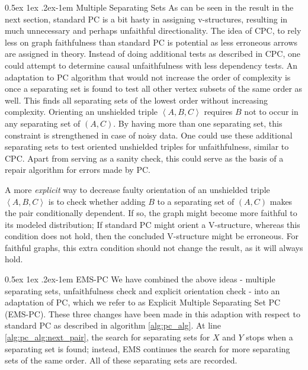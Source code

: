 \documentclass[a4paper, 10pt, english, onecolumn]{article}
\makeatletter
\renewcommand{\paragraph}{%
  \@startsection{paragraph}{4}%
  {\z@}{0.5ex \@plus 1ex \@minus .2ex}{-1em}%
  {\normalfont\normalsize\bfseries}%
}
\makeatother
\begin{document}
\paragraph{Multiple Separating Sets}
As can be seen in the result in the next section, standard PC is a bit hasty in assigning v-structures, resulting in much unnecessary and perhaps unfaithful directionality.
The idea of CPC, to rely less on graph faithfulness than standard PC is potential as less erroneous arrows are assigned in theory.
Instead of doing additional tests as described in CPC, one could attempt to determine causal unfaithfulness with less dependency tests.
An adaptation to PC algorithm that would not increase the order of complexity is once a separating set is found to test all other vertex subsets of the same order as well.
This finds all separating sets of the lowest order without increasing complexity.
Orienting an unshielded triple $\left<A,B,C\right>$ requires $B$ not to occur in any separating set of $(A,C)$.
By having more than one separating set, this constraint is strengthened in case of noisy data.
One could use these additional separating sets to test oriented unshielded triples for unfaithfulness, similar to CPC.
Apart from serving as a sanity check, this could serve as the basis of a repair algorithm for errors made by PC.

A more \textit{explicit} way to decrease faulty orientation of an unshielded triple $\left<A,B,C\right>$ is to check whether adding $B$ to a separating set of $(A,C)$ makes the pair conditionally dependent.
If so, the graph might become more faithful to its modeled distribution; If standard PC might orient a V-structure, whereas this condition does not hold, then the concluded V-structure might be erroneous.
For faithful graphs, this extra condition should not change the result, as it will always hold.

\paragraph{EMS-PC}
We have combined the above ideas - multiple separating sets, unfaithfulness check and explicit orientation check - into an adaptation of PC, which we refer to as Explicit Multiple Separating Set PC (EMS-PC).
These three changes have been made in this adaption with respect to standard PC as described in algorithm \ref{alg:pc_alg}.
At line \ref{alg:pc_alg:next_pair}, the search for separating sets for $X$ and $Y$ stops when a separating set is found; instead, EMS continues the search for more separating sets of the same order.
All of these separating sets are recorded.
\end{document}
